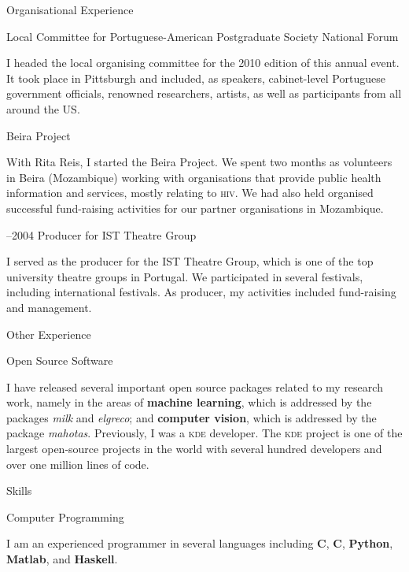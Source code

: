 \documentclass{article}
\renewcommand\section[1]{%
    \par\vspace{2em}\penalty-100%
    {\subhead #1}%
    \par\penalty100\vspace{1em}\penalty100%
}
\newcommand\cvitem[2][\relax]{%
    \par\vspace{.8em}
    \if\relax#1\else{\Date \textcolor{medg}{#1}}\hspace{1em}\fi%
    {\CvItem #2}%
    \par\vspace{.4em}
}
\begin{document}
\section{Organisational Experience}

\cvitem[2010]{Local Committee for Portuguese-American Postgraduate Society National Forum}
I headed the local organising committee for the 2010 edition of this annual
event. It took place in Pittsburgh and included, as speakers, cabinet-level
Portuguese government officials, renowned researchers, artists, as well as
participants from all around the US.

\cvitem[2010]{Beira Project}
With Rita Reis, I started the Beira Project. We spent two months as volunteers
in Beira (Mozambique) working with organisations that provide public health
information and services, mostly relating to \textsc{hiv}. We had also held
organised successful fund-raising activities for our partner organisations in
Mozambique.

\cvitem[2002--2004]{Producer for IST Theatre Group}
I served as the producer for the IST Theatre Group, which is one of the top
university theatre groups in Portugal. We participated in several festivals,
including international festivals. As producer, my activities included
fund-raising and management.

\section{Other Experience}

\cvitem{Open Source Software}
I have released several important open source packages related to my research
work, namely in the areas of \textbf{machine learning}, which is addressed by
the packages \textit{milk} and \textit{elgreco}; and \textbf{computer vision},
which is addressed by the package \textit{mahotas}. Previously, I was a
\textsc{kde} developer. The \textsc{kde} project is one of the largest
open-source projects in the world with several hundred developers and over one
million lines of code.

\section{Skills}

\cvitem{Computer Programming}
I am an experienced programmer in several languages including \textbf{C},
\textbf{C\raisebox{.2em}{\tiny \bf ++}}, \textbf{Python}, \textbf{Matlab}, and
\textbf{Haskell}.
\end{document}
